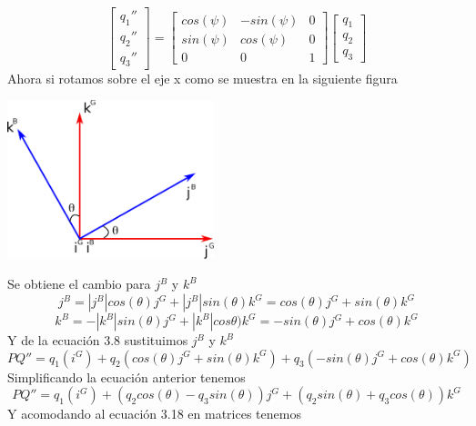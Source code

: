 \begin{equation}
	\begin{bmatrix}
		q_1'' \\
		q_2'' \\
		q_3''
	\end{bmatrix}
	=
	\begin{bmatrix}
		cos(\psi) & -sin(\psi) & 0 \\
		sin(\psi) & cos(\psi)  & 0 \\
		0         & 0          & 1
	\end{bmatrix}
	\begin{bmatrix}
		q_1 \\
		q_2 \\
		q_3
	\end{bmatrix}
\end{equation}
Ahora si rotamos sobre el eje x como se muestra en la siguiente figura
\begin{center}
	\includegraphics[width=0.45\textwidth]{Contenido/Cuerpo/Capitulo3/Fig17.eps}
	\label{fig:ModeloMat:Fig1}
\end{center}
Se obtiene el cambio para $j^B$ y $k^B$
\begin{equation}
	j^B = |j^B|cos(\theta)j^G + |j^B|sin(\theta)k^G = cos(\theta)j^G + sin(\theta)k^G
\end{equation}
\begin{equation}
	k^B = -|k^B|sin(\theta)j^G + |k^B|cos\theta)k^G = -sin(\theta)j^G + cos(\theta)k^G
\end{equation}
Y de la ecuación 3.8 sustituimos $j^B$ y $k^B$
\begin{equation}
	PQ'' = q_1(i^G) + q_2(cos(\theta)j^G + sin(\theta)k^G) + q_3(-sin(\theta)j^G + cos(\theta)k^G)
\end{equation}
Simplificando la ecuación anterior tenemos
\begin{equation}
	PQ''= q_1(i^G) + (q_2cos(\theta) - q_3sin(\theta))j^G + (q_2sin(\theta) + q_3cos(\theta))k^G
\end{equation}
Y acomodando al ecuación 3.18 en matrices tenemos
